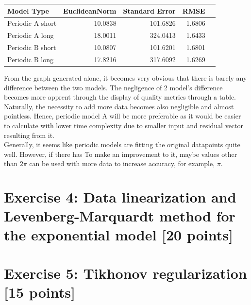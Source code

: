 \documentclass[unicode,11pt,a4paper,oneside,numbers=endperiod,openany]{scrartcl}
\begin{document}
\begin{enumerate}[label=(\alph*)]
\begin{center}
\begin{tabular}{|l|r|r|r|r|} \hline
Model Type & EuclideanNorm & Standard Error & RMSE \\
\hline
  Periodic A short  & 10.0838 & 101.6826 & 1.6806\\
\hline
  Periodic A long & 18.0011 & 324.0413 & 1.6433\\
\hline
  Periodic B short  & 10.0807 & 101.6201 & 1.6801\\
\hline
  Periodic B long & 17.8216 & 317.6092 & 1.6269\\
\hline
\end{tabular}
\end{center}

\vspace{20px}

From the graph generated alone, it becomes very obvious that there is barely any difference between the two models. The negligence of 2 model's difference becomes more apprent through the display of quality metrics through a table. Naturally, the necessity to add more data becomes also negligible and almost pointless. Hence, periodic model A will be more preferable as it would be easier to calculate with lower time complexity due to smaller input and residual vector resulting from it. \\

Generally, it seems like periodic models are fitting the original datapoints quite well. However, if there has  To make an improvement to it, maybe values other than ${2\pi}$ can be used with more data to increase accuracy, for example, ${\pi}$.

\end{enumerate}

\section*{Exercise 4: Data linearization and Levenberg-Marquardt method for the exponential model [20 points]}

\section*{Exercise 5: Tikhonov regularization [15 points]}
\end{document}
